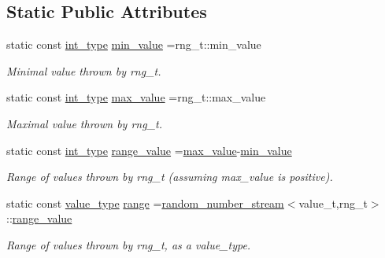\subsection*{Static Public Attributes}
\begin{DoxyCompactItemize}
\item 
\hypertarget{a00471_a52779e1c6d29463ea54695edd61c8ba3}{}static const \hyperlink{a00471_aaea501ae2db60d08b10b98b3cf499f37}{int\+\_\+type} \hyperlink{a00471_a52779e1c6d29463ea54695edd61c8ba3}{min\+\_\+value} =rng\+\_\+t\+::min\+\_\+value\label{a00471_a52779e1c6d29463ea54695edd61c8ba3}

\begin{DoxyCompactList}\small\item\em Minimal value thrown by rng\+\_\+t. \end{DoxyCompactList}\item 
\hypertarget{a00471_ada49cf2023194ff542387f01032f7116}{}static const \hyperlink{a00471_aaea501ae2db60d08b10b98b3cf499f37}{int\+\_\+type} \hyperlink{a00471_ada49cf2023194ff542387f01032f7116}{max\+\_\+value} =rng\+\_\+t\+::max\+\_\+value\label{a00471_ada49cf2023194ff542387f01032f7116}

\begin{DoxyCompactList}\small\item\em Maximal value thrown by rng\+\_\+t. \end{DoxyCompactList}\item 
\hypertarget{a00471_a62cfe3c49122f089f839869ee502f6a9}{}static const \hyperlink{a00471_aaea501ae2db60d08b10b98b3cf499f37}{int\+\_\+type} \hyperlink{a00471_a62cfe3c49122f089f839869ee502f6a9}{range\+\_\+value} =\hyperlink{a00471_ada49cf2023194ff542387f01032f7116}{max\+\_\+value}-\/\hyperlink{a00471_a52779e1c6d29463ea54695edd61c8ba3}{min\+\_\+value}\label{a00471_a62cfe3c49122f089f839869ee502f6a9}

\begin{DoxyCompactList}\small\item\em Range of values thrown by rng\+\_\+t (assuming max\+\_\+value is positive). \end{DoxyCompactList}\item 
\hypertarget{a00471_a11eb62d9f8ec484e79a125f440c78cf7}{}static const \hyperlink{a00471_a9294408b4bf4d469d2cb1682e10225a8}{value\+\_\+type} \hyperlink{a00471_a11eb62d9f8ec484e79a125f440c78cf7}{range} =\hyperlink{a00471}{random\+\_\+number\+\_\+stream}$<$value\+\_\+t,rng\+\_\+t$>$\+::\hyperlink{a00471_a62cfe3c49122f089f839869ee502f6a9}{range\+\_\+value}\label{a00471_a11eb62d9f8ec484e79a125f440c78cf7}

\begin{DoxyCompactList}\small\item\em Range of values thrown by rng\+\_\+t, as a value\+\_\+type. \end{DoxyCompactList}\end{DoxyCompactItemize}


